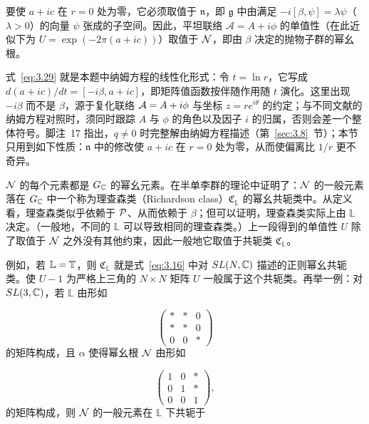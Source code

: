 要使 $a+ic$ 在 $r=0$ 处为零，它必须取值于 $\mathfrak n$，即 $\mathfrak g$ 中由满足 $-i[\beta,\psi]=\lambda\psi$（$\lambda>0$）的向量 $\psi$ 张成的子空间。因此，平坦联络 ${\mathcal A}=A+i\phi$ 的单值性（在此近似下为 $U=\exp(-2\pi(a+ic))$）取值于 $\mathcal{N}$，即由 $\beta$ 决定的抛物子群的幂幺根。

\begin{yizhu}[易错点]
式~\eqref{eq:3.29} 就是本题中纳姆方程的线性化形式：令 $t=\ln r$，它写成 $d(a+ic)/dt=[-i\beta,a+ic]$，即矩阵值函数按伴随作用随 $t$ 演化。这里出现 $-i\beta$ 而不是 $\beta$，源于复化联络 ${\mathcal A}=A+i\phi$ 与坐标 $z=re^{i\theta}$ 的约定；与不同文献的纳姆方程对照时，须同时跟踪 $A$ 与 $\phi$ 的角色以及因子 $i$ 的归属，否则会差一个整体符号。脚注~17 指出，$q\not=0$ 时完整解由纳姆方程描述（第~\ref{sec:3.8}~节）；本节只用到如下性质：$\mathfrak n$ 中的修改使 $a+ic$ 在 $r=0$ 处为零，从而使偏离比 $1/r$ 更不奇异。
\end{yizhu}

$\mathcal{N}$ 的每个元素都是 $G_{\mathbb{C}}$ 的幂幺元素。在半单李群的理论中证明了：$\mathcal{N}$ 的一般元素落在 $G_{\mathbb{C}}$ 中一个称为理查森类（Richardson class）${\mathfrak C}_\mathbb{L}$ 的幂幺共轭类中。从定义看，理查森类似乎依赖于 $\mathcal{P}$、从而依赖于 $\beta$；但可以证明，理查森类实际上由 $\mathbb{L}$ 决定。（一般地，不同的 $\mathbb{L}$ 可以导致相同的理查森类。）上一段得到的单值性 $U$ 除了取值于 $\mathcal{N}$ 之外没有其他约束，因此一般地它取值于共轭类 ${\mathfrak C}_\mathbb{L}$。

例如，若 $\mathbb{L}={\mathbb{T}}$，则 ${\mathfrak C}_\mathbb{L}$ 就是式~\eqref{eq:3.16} 中对 $SL(N,{\mathbb{C}})$ 描述的正则幂幺共轭类。使 $U-1$ 为严格上三角的 $N\times N$ 矩阵 $U$ 一般属于这个共轭类。再举一例：对 $SL(3,{\mathbb{C}})$，若
$\mathbb{L}$ 由形如

\setcounter{equation}{29}
\begin{equation}\label{eq:3.30}
  \left(\begin{matrix}* & * & 0 \\
                        * & * & 0 \\
                        0 & 0 & * \end{matrix}\right)
\end{equation}
的矩阵构成，且 $\alpha$ 使得幂幺根 $\mathcal{N}$ 由形如

\setcounter{equation}{30}
\begin{equation}\label{eq:3.31}
  \left(\begin{matrix}1 & 0 &* \\
                        0 & 1 & * \\
                        0 & 0 & 1 \end{matrix}\right),
\end{equation}
的矩阵构成，则 $\mathcal{N}$ 的一般元素在 $\mathbb{L}$ 下共轭于

